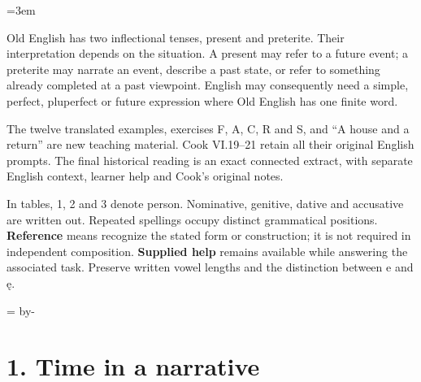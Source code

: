 \newcommand{\runningtitle}{Unit 12. Tense, sequence, and voice}

\emergencystretch=3em
\newcommand{\itempara}[2]{\par\addvspace{3pt}\noindent\hangindent=1.8em\hangafter=1\makebox[1.8em][l]{#1.}#2\par}
\newcommand{\reserve}[1]{\par\penalty-100\begingroup\dimen0=\pagegoal\advance\dimen0 by-\pagetotal\ifdim\dimen0<#1\newpage\fi\endgroup}

\raggedright
{}

Old English has two inflectional tenses, present and preterite. Their interpretation depends on the situation. A present may refer to a future event; a preterite may narrate an event, describe a past state, or refer to something already completed at a past viewpoint. English may consequently need a simple, perfect, pluperfect or future expression where Old English has one finite word.

The twelve translated examples, exercises F, A, C, R and S, and “A house and a return” are new teaching material. Cook VI.19–21 retain all their original English prompts. The final historical reading is an exact connected extract, with separate English context, learner help and Cook’s original notes.

In tables, 1, 2 and 3 denote person. Nominative, genitive, dative and accusative are written out. Repeated spellings occupy distinct grammatical positions. \textbf{Reference} means recognize the stated form or construction; it is not required in independent composition. \textbf{Supplied help} remains available while answering the associated task. Preserve written vowel lengths and the distinction between e and ę.

\reserve{7\baselineskip}
\section*{1. Time in a narrative}


